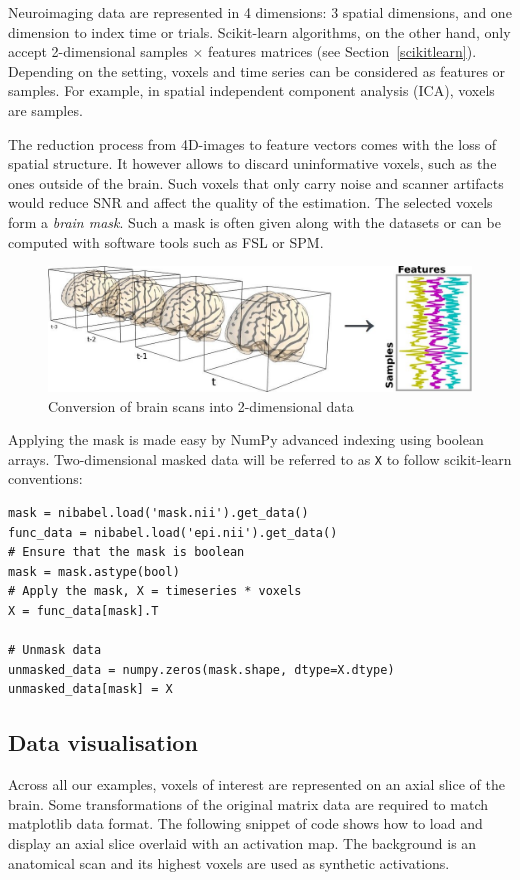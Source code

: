 \documentclass{frontiersSCNS} %
\begin{document}
Neuroimaging data are represented in 4 dimensions: 3 spatial dimensions, and 
one dimension to index time or trials.
Scikit-learn algorithms, on the other hand, only accept 2-dimensional
samples $\times$ features matrices (see Section~\ref{scikitlearn}).
Depending on the setting, voxels and time series can be
considered as features
or samples. For example, in spatial independent component analysis (ICA),
voxels are samples.


The reduction process from 4D-images to feature vectors comes with the loss
of spatial structure. It however allows to discard uninformative
voxels, such as the ones outside of the brain. Such voxels that
only carry noise and scanner artifacts would reduce SNR and affect the
quality of the estimation. The selected voxels form a \emph{brain mask}.
Such a mask is often given along with the datasets or can be computed
with software tools such as FSL or SPM.

\begin{figure}[hbtp]
    \begin{center}
        \includegraphics[width=.5\linewidth]{niimgs.jpg}
    \end{center}
    \caption{Conversion of brain scans into 2-dimensional data}
    \label{fig:niimg}
\end{figure}

Applying the mask is made easy by NumPy advanced indexing using boolean arrays.
Two-dimensional masked data will be referred to as \texttt{X} to follow
scikit-learn conventions:
\begin{lstlisting}
mask = nibabel.load('mask.nii').get_data()
func_data = nibabel.load('epi.nii').get_data()
# Ensure that the mask is boolean
mask = mask.astype(bool)
# Apply the mask, X = timeseries * voxels
X = func_data[mask].T

# Unmask data
unmasked_data = numpy.zeros(mask.shape, dtype=X.dtype)
unmasked_data[mask] = X
\end{lstlisting}

\subsection{Data visualisation}

Across all our examples, voxels of interest are represented on an axial slice of
the brain. Some transformations of the original matrix data are required to match
matplotlib data format. The following snippet of code shows how to load and
display an axial slice overlaid with an activation map. The background is an
anatomical scan and its highest voxels are used as synthetic
activations.
\end{document}
